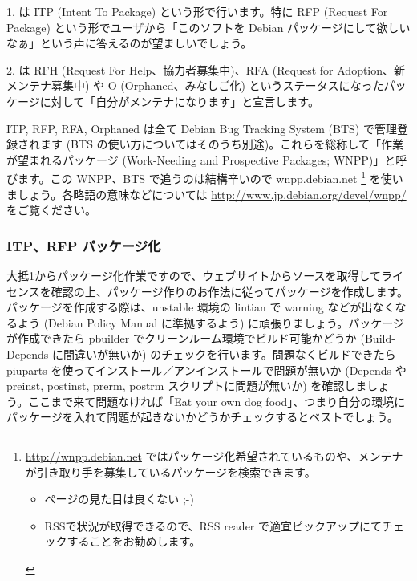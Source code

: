 \documentclass[mingoth,a4paper]{jsarticle}
\begin{document}
1. は ITP (Intent To Package) という形で行います。特に RFP (Request For Package) という形でユーザから「このソフトを Debian パッケージにして欲しいなぁ」という声に答えるのが望ましいでしょう。

2. は RFH (Request For Help、協力者募集中)、RFA (Request for Adoption、新メンテナ募集中) や O (Orphaned、みなしご化) というステータスになったパッケージに対して「自分がメンテナになります」と宣言します。

ITP, RFP, RFA, Orphaned は全て Debian Bug Tracking System (BTS) で管理登録されます (BTS の使い方についてはそのうち別途)。これらを総称して「作業が望まれるパッケージ (Work-Needing and Prospective Packages; WNPP)」と呼びます。この WNPP、BTS で追うのは結構辛いので wnpp.debian.net \footnote{ \url{http://wnpp.debian.net} ではパッケージ化希望されているものや、メンテナが引き取り手を募集しているパッケージを検索できます。
\begin{itemize}
 \item ページの見た目は良くない ;-)
 \item RSSで状況が取得できるので、RSS reader で適宜ピックアップにてチェックすることをお勧めします。
\end{itemize}} を使いましょう。各略語の意味などについては \url{http://www.jp.debian.org/devel/wnpp/} をご覧ください。


\subsubsection{ITP、RFP パッケージ化}

大抵1からパッケージ化作業ですので、ウェブサイトからソースを取得してライセンスを確認の上、パッケージ作りのお作法に従ってパッケージを作成します。パッケージを作成する際は、unstable 環境の lintian で warning などが出なくなるよう (Debian Policy Manual に準拠するよう) に頑張りましょう。パッケージが作成できたら pbuilder でクリーンルーム環境でビルド可能かどうか (Build-Depends に間違いが無いか) のチェックを行います。問題なくビルドできたら piuparts を使ってインストール／アンインストールで問題が無いか (Depends や preinst, postinst, prerm, postrm スクリプトに問題が無いか) を確認しましょう。ここまで来て問題なければ「Eat your own dog food」、つまり自分の環境にパッケージを入れて問題が起きないかどうかチェックするとベストでしょう。
\end{document}
